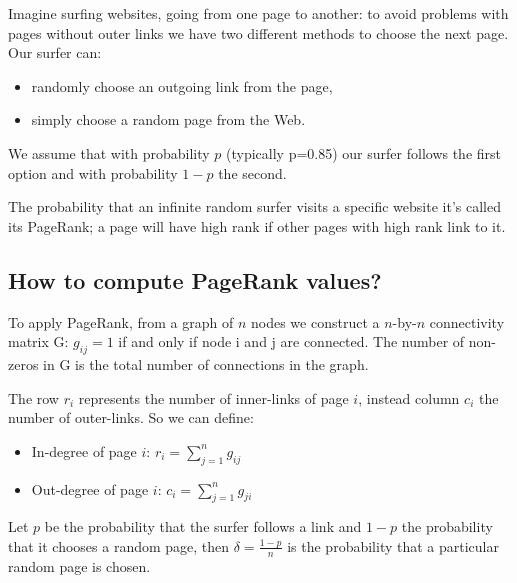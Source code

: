 \documentclass[12 pt]{article}
\newcommand\tab[1][1cm]{\hspace*{#1}}
\begin{document}
Imagine surfing websites, going from one page to another: to avoid problems with pages without outer links we have two different methods to choose the next page. Our surfer can:
\begin{itemize}
\item randomly choose an outgoing link from the page,
\item simply choose a random page from the Web.
\end{itemize}
We assume that with probability $p$ (typically p=0.85) our surfer follows the first option and with probability $1-p$ the second.

The probability that an infinite random surfer visits a specific website it's called its PageRank; a page will have high rank if other pages with high rank link to it.
\subsection{How to compute PageRank values?}
To apply PageRank, from a graph of $n$ nodes we construct a $n$-by-$n$ connectivity matrix G: $g_{ij}=1$ if and only if node i and j are connected. The number of non-zeros in G is the total number of connections in the graph.

The row $r_i$ represents the number of inner-links of page $i$, instead column $c_i$ the number of outer-links. So we can define:
\begin{itemize}
\item In-degree of page $i$: \tab $r_i = \sum\limits_{j=1}^{n} g_{ij}$
\item Out-degree of page $i$: \tab $c_i = \sum\limits_{j=1}^{n} g_{ji}$
\end{itemize}
Let $p$ be the probability that the surfer follows a link and $1-p$ the probability that it chooses a random page, then $\delta = \frac{1-p}{n}$ is the probability that a particular random page is chosen.
\end{document}
